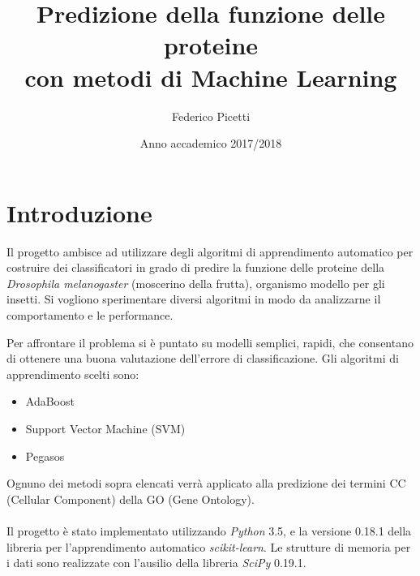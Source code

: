 \documentclass[12pt,a4paper,oneside,hidelinks]{report}
\begin{document}

\title{%
        Predizione della funzione delle proteine \\
        con metodi di Machine Learning}
  
\author{Federico Picetti \\
        }

\date{Anno accademico 2017/2018} 

\maketitle

\tableofcontents


\newpage

\section*{Introduzione}
Il progetto ambisce ad utilizzare degli algoritmi di apprendimento automatico per costruire dei classificatori in grado di predire la funzione delle proteine della \textit{Drosophila melanogaster} (moscerino della frutta), organismo modello per gli insetti. Si vogliono sperimentare diversi algoritmi in modo da analizzarne il comportamento e le performance. 

Per affrontare il problema si è puntato su modelli semplici, rapidi, che consentano di ottenere una buona valutazione dell'errore di classificazione. Gli algoritmi di apprendimento scelti sono: 

\begin{itemize}
    \item AdaBoost
    \item Support Vector Machine (SVM)    
    \item Pegasos
\end{itemize}

Ognuno dei metodi sopra elencati verrà applicato alla predizione dei termini CC (Cellular Component) della GO (Gene Ontology).

\paragraph*{}
Il progetto è stato implementato utilizzando \textit{Python} 3.5, e la versione 0.18.1 della libreria per l'apprendimento automatico \textit{scikit-learn}. Le strutture di memoria per i dati sono realizzate con l'ausilio della libreria \textit{SciPy} 0.19.1.
\end{document}
